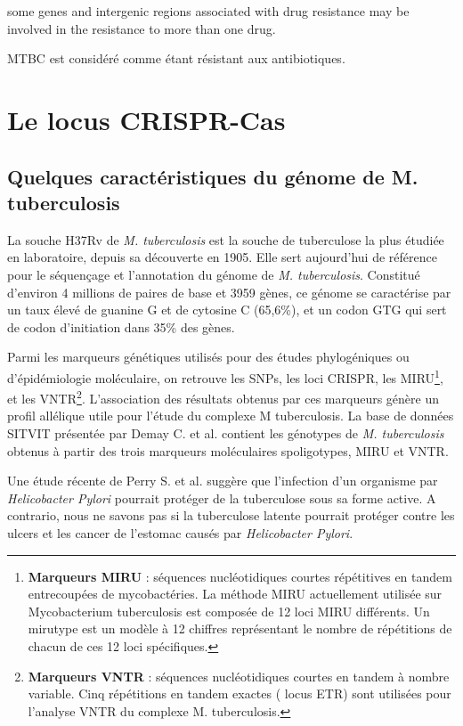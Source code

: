 \documentclass[twoside,a4paper,11pt,frenchb,openany]{report}
\begin{document}
some genes and intergenic regions associated with drug resistance may be involved in the resistance to more than one drug.

MTBC est considéré comme étant résistant aux antibiotiques.


\section{Le locus CRISPR-Cas}

\subsection{Quelques caractéristiques du génome de M. tuberculosis}

La souche H37Rv de \textit{M. tuberculosis} est la souche de tuberculose la plus étudiée en laboratoire, depuis sa découverte en 1905. Elle sert aujourd'hui de référence pour le séquençage et l'annotation du génome de \textit{M. tuberculosis}. Constitué d'environ 4 millions de paires de base et 3959 gènes, ce génome se caractérise par un taux élevé de guanine G et de cytosine C (65,6\%), et un codon GTG qui sert de codon d'initiation dans 35\% des gènes. 

Parmi les marqueurs génétiques utilisés pour des études phylogéniques ou d'épidémiologie moléculaire, on retrouve les SNPs, les loci CRISPR, les MIRU\footnote{\textbf{Marqueurs MIRU} : séquences nucléotidiques courtes répétitives en tandem entrecoupées de mycobactéries. La méthode MIRU actuellement utilisée sur Mycobacterium tuberculosis est composée de 12 loci MIRU différents. Un mirutype est un modèle à 12 chiffres représentant le nombre de répétitions de chacun de ces 12 loci spécifiques.}, et les VNTR\footnote{\textbf{Marqueurs VNTR} : séquences nucléotidiques courtes en tandem à nombre variable. Cinq répétitions en tandem exactes ( locus ETR) sont utilisées pour l'analyse VNTR du complexe M. tuberculosis.}. L'association des résultats obtenus par ces marqueurs génère un profil allélique utile pour l'étude du complexe M tuberculosis. La base de données SITVIT présentée par Demay C. et al.\cite{demay} contient les génotypes de \textit{M. tuberculosis} obtenus à partir des trois marqueurs moléculaires spoligotypes, MIRU et VNTR.

Une étude récente de Perry S. et al.\cite{perry1, perry2} suggère que l'infection d'un organisme par \textit{Helicobacter Pylori} pourrait protéger de la tuberculose sous sa forme active. A contrario, nous ne savons pas si la tuberculose latente pourrait protéger contre les ulcers et les cancer de l'estomac causés par \textit{Helicobacter Pylori}.
\end{document}
